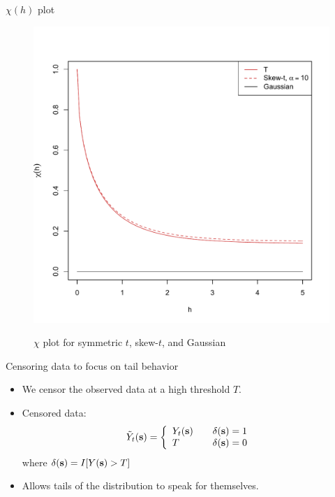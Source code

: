 \documentclass{beamer}
\begin{document}
\begin{frame}{$\chi(h)$ plot}
  \vspace{-2em}
  \centering
  \begin{figure}
  \includegraphics[width=.65\linewidth]{./plots/pot/chi-h-t_and_gaus.pdf}\\[-0.2in]
  \caption{$\chi$ plot for symmetric $t$, skew-$t$, and Gaussian}
  \end{figure}
\end{frame}

\begin{frame}{Censoring data to focus on tail behavior}
  \begin{itemize} \setlength{\itemsep}{0.5em}
    \item We censor the observed data at a high threshold $T$.
    \item Censored data:
    \begin{align*}
      \tilde{Y}_t(\mbox{\bf s}) = \left\{ \begin{array}{ll}
          Y_t(\mbox{\bf s}) \quad & \delta(\mbox{\bf s}) = 1\\
          T \quad & \delta(\mbox{\bf s}) = 0
      \end{array}\right.
    \end{align*}
    where $\delta(\mbox{\bf s}) = I[Y(\mbox{\bf s}) > T]$
    \item Allows tails of the distribution to speak for themselves.
  \end{itemize}
\end{frame}
\end{document}
